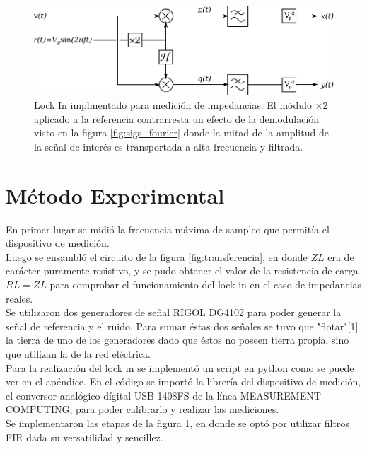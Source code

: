\documentclass[11pt,a4paper]{extarticle}
\begin{document}
\begin{multicols}{2}
\begin{figure}[H]
	\centering
	\includegraphics[width=\linewidth]{Images/nuestro_lockin.eps}
	\caption{Lock In implmentado para medición de impedancias. El módulo $\times 2$ aplicado a la referencia contrarresta un efecto de la demodulación visto en la figura \ref{fig:sigs_fourier} donde la mitad de la amplitud de la señal de interés es transportada a alta frecuencia y filtrada.}
	\label{fig:nuestro_lockin}
\end{figure}

\section{Método Experimental}
En primer lugar se midió la frecuencia máxima de 
sampleo que permitía el dispositivo de medición.\\

Luego se ensambló el circuito de la figura 
\ref{fig:transferencia}, en donde $ZL$ era de carácter
 puramente resistivo, y se pudo obtener 
el valor de la resistencia de carga $RL = ZL$ para 
comprobar el funcionamiento del lock in en el caso 
de impedancias reales.\\ 

Se utilizaron dos generadores de señal RIGOL DG4102 
para poder generar la señal de referencia y el ruido.
Para sumar éstas dos señales se tuvo que "flotar"[1] la 
tierra de uno de los generadores dado que éstos no poseen 
tierra propia, sino que utilizan la de la red eléctrica.\\

Para la realización del lock in se implementó un 
script en python como se puede ver en el apéndice.
En el código se importó la librería del dispositivo 
de medición, el 
conversor analógico dígital USB-1408FS de la línea 
MEASUREMENT COMPUTING, para poder 
calibrarlo y realizar las mediciones.\\

Se implementaron 
las etapas de la figura \ref{fig:nuestro_lockin},
 en donde se optó por utilizar filtros FIR dada 
 su versatilidad y sencillez.\\


\end{multicols}
\end{document}
